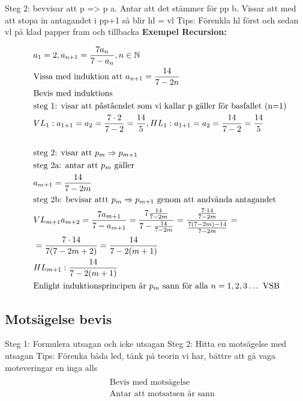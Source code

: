 Steg 2: bevvisar att p => p
a. Antar att det stämmer för pp
b. Vissar att med att stopa in antagandet i pp+1 så blir hl = vl
Tips: Förenkla hl först och sedan vl på klad papper fram och tillbacka
\textbf{Exempel Recursion:}\par
\begin{align*}
  &\quad  a_1 = 2, a_{n+1} = \frac{7a_n}{7-a_n}, n \in \mathbb{N} \\
  &\quad  \text{Vissa med induktion att } a_{n+1} = \frac{14}{7-2n} \\ 
  &\quad  \text{Bevis med induktions} \\
  &\quad  \text{steg 1: visar att påståendet som vi kallar p gäller för basfallet (n=1)} \\
  &\quad  VL_1: a_{1+1}=a_2=\frac{7 \cdot 2}{7-2}=\frac{14}{5}, HL_1: a_{1+1}=a_2=\frac{14}{7-2}=\frac{14}{5} \\
  &\quad  \\
  &\quad  \text{steg 2: visar att } p_m \Rightarrow p_{m+1} \\
  &\quad  \text{steg 2a: antar att } p_m \text{ gäller} \\
  &\quad  a_{m+1}=\frac{14}{7-2m}\\
  &\quad  \text{steg 2b: bevisar attt } p_m \Rightarrow p_{m+1} \text{ genom att andvända antagandet} \\
  &\quad  VL_{m+1}a_{m+2}=\frac{7a_{m+1}}{7-a_{m+1}} = \frac{7 \frac{14}{7-2m}}{7-\frac{14}{7-2m}} = \frac{\frac{7 \cdot14}{7-2m}}{\frac{7(7-2m) - 14}{7-2m}} = \\
  &\quad  = \frac{7 \cdot 14}{7(7-2m+2)} = \frac{14}{7-2(m+1)} \\
  &\quad  HL_{m+1}: \frac{14}{7-2(m+1)} \\
  &\quad  \text{Enlight induktionsprincipen är $ p_m $ sann för alla } n = 1,2,3 \ldots \text{ VSB}  \\
\end{align*}

\subsection{Motsägelse bevis}
Steg 1: Formulera utsagan och icke utsagan
Steg 2: Hitta en motsägelse med utsagan
Tips: Förenka båda led, tänk på teorin vi har, bättre att gå vaga moteveringar en inga alls
\begin{align*}
  &\quad  \\
  &\quad  \text{Bevis med motsägelse } \\
  &\quad  \text{Antar att motsatsen är sann  } \\
  &\quad  \\
\end{align*}


